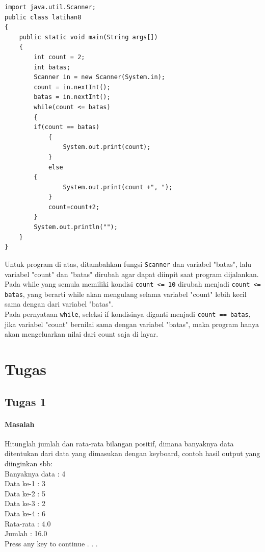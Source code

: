 \documentclass[a4paper,12pt]{article}
\begin{document}
\begin{lstlisting}[frame=single]
import java.util.Scanner;
public class latihan8
{
    public static void main(String args[])
    {
        int count = 2;
        int batas;
        Scanner in = new Scanner(System.in);
        count = in.nextInt();
        batas = in.nextInt();
        while(count <= batas)
        {
	    if(count == batas)
            {
	            System.out.print(count);
            }
            else
	    {
	            System.out.print(count +", ");
            }
            count=count+2;
        }
        System.out.println("");
    }
}
\end{lstlisting}
Untuk program di atas, ditambahkan fungsi \texttt{Scanner} dan variabel "batas", lalu variabel "count" dan "batas" dirubah agar dapat diinpit saat program dijalankan. Pada while yang semula memiliki kondisi \texttt{count <= 10} dirubah menjadi \texttt{count <= batas}, yang berarti while akan mengulang selama variabel "count" lebih kecil sama dengan dari variabel "batas".\\
Pada pernyataan \texttt{while}, seleksi if kondisinya diganti menjadi \texttt{count == batas}, jika variabel "count" bernilai sama dengan variabel "batas", maka program hanya akan mengeluarkan nilai dari count saja di layar.

\section{Tugas}
\subsection{Tugas 1}
\paragraph{Masalah\\}
Hitunglah jumlah dan rata-rata bilangan positif, dimana banyaknya data ditentukan
dari data yang dimasukan dengan keyboard, contoh hasil output yang diinginkan
sbb:\\[1ex]
Banyaknya data : 4\\
Data ke-1 : 3\\
Data ke-2 : 5\\
Data ke-3 : 2\\
Data ke-4 : 6\\
Rata-rata : 4.0\\
Jumlah : 16.0\\
Press any key to continue . . .\\[1ex]
\end{document}
